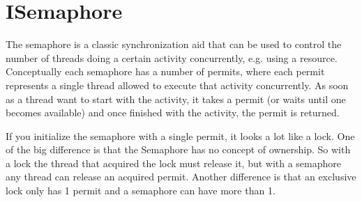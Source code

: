 \section{ISemaphore}
The semaphore is a classic synchronization aid that can be used to control the number of threads doing a certain activity concurrently, e.g. using a resource. Conceptually each semaphore has a number of permits, where each permit represents a single thread allowed to execute that activity concurrently. As soon as a thread want to start with the activity, it takes a permit (or waits until one becomes available) and once finished with the activity, the permit is returned.

If you initialize the semaphore with a single permit, it looks a lot like a lock. One of the big difference is that the Semaphore has no concept of ownership. So with a lock the thread that acquired the lock must release it, but with a semaphore any thread can release an acquired permit. Another difference is that an exclusive lock only has 1 permit and a semaphore can have more than 1.

